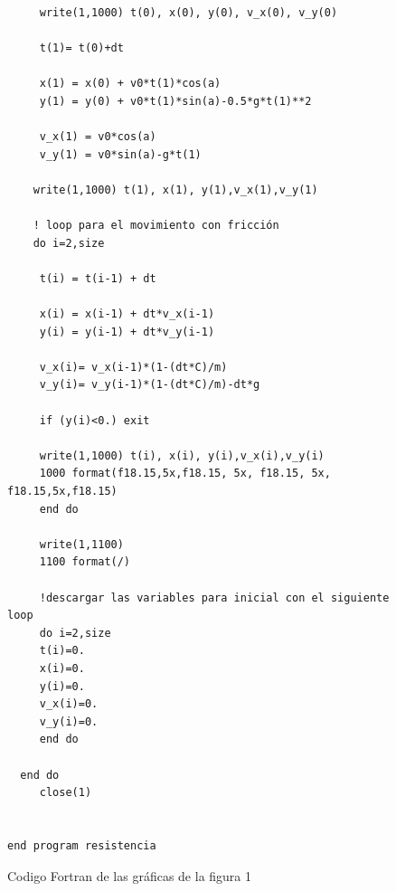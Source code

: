 \documentclass[12pt,a4paper,twoside]{article}
\begin{document}
\begin{figure}[h]
\centering
\begin{verbatim}
     write(1,1000) t(0), x(0), y(0), v_x(0), v_y(0)
     
     t(1)= t(0)+dt

     x(1) = x(0) + v0*t(1)*cos(a)
     y(1) = y(0) + v0*t(1)*sin(a)-0.5*g*t(1)**2
       
     v_x(1) = v0*cos(a)
     v_y(1) = v0*sin(a)-g*t(1)
     
    write(1,1000) t(1), x(1), y(1),v_x(1),v_y(1)

    ! loop para el movimiento con fricción  
    do i=2,size

     t(i) = t(i-1) + dt
         
     x(i) = x(i-1) + dt*v_x(i-1)
     y(i) = y(i-1) + dt*v_y(i-1)
     
     v_x(i)= v_x(i-1)*(1-(dt*C)/m)
     v_y(i)= v_y(i-1)*(1-(dt*C)/m)-dt*g
    
     if (y(i)<0.) exit 
      
     write(1,1000) t(i), x(i), y(i),v_x(i),v_y(i)
     1000 format(f18.15,5x,f18.15, 5x, f18.15, 5x, f18.15,5x,f18.15) 
     end do
  
     write(1,1100)
     1100 format(/)

     !descargar las variables para inicial con el siguiente loop
     do i=2,size
     t(i)=0.
     x(i)=0.
     y(i)=0.
     v_x(i)=0.
     v_y(i)=0.
     end do

  end do 
     close(1)
  

end program resistencia
\end{verbatim}
\caption{Codigo Fortran de las gráficas de la figura 1}
\label{fig:figura2}
\end{figure}
\end{document}
